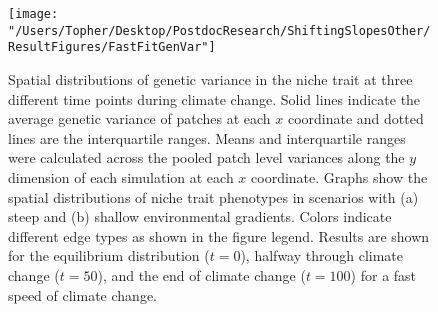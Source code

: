 \documentclass[11pt]{article}
\begin{document}
\clearpage

\begin{figure}[h!]
\texttt{[image: "/Users/Topher/Desktop/PostdocResearch/ShiftingSlopesOther/ResultFigures/FastFitGenVar"]}
\caption{Spatial distributions of genetic variance in the niche trait at three different time points during climate change. Solid lines indicate the average genetic variance of patches at each $x$ coordinate and dotted lines are the interquartile ranges. Means and interquartile ranges were calculated across the pooled patch level variances along the $y$ dimension of each simulation at each $x$ coordinate. Graphs show the spatial distributions of niche trait phenotypes in scenarios with (a) steep and (b) shallow environmental gradients. Colors indicate different edge types as shown in the figure legend. Results are shown for the equilibrium distribution ($t = 0$), halfway through climate change ($t = 50$), and the end of climate change ($t = 100$) for a fast speed of climate change.}
\label{Fig:FitGenVarFast}
\end{figure}
\end{document}
